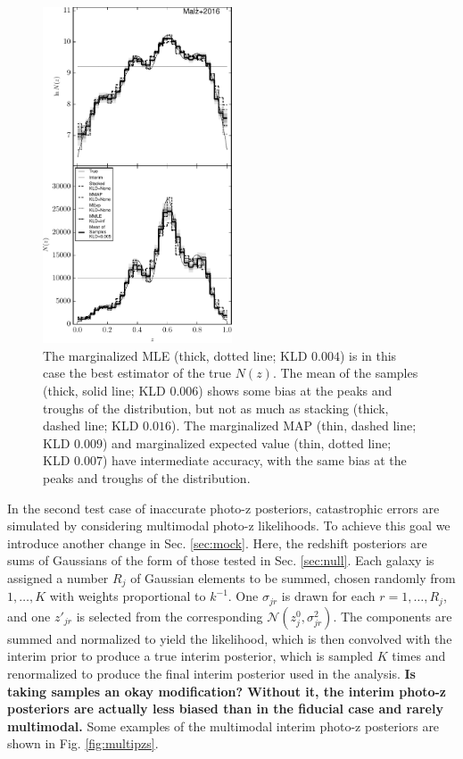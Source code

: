 \documentclass[preprint]{aastex}
\begin{document}
\begin{figure}
\includegraphics[width=0.5\textwidth]{figs/vars/comps.pdf}
\caption{The marginalized MLE (thick, dotted line; KLD $0.004$) is in this case 
the best estimator of the true $N(z)$.  The mean of the samples (thick, solid 
line; KLD $0.006$) shows some bias at the peaks and troughs of the 
distribution, but not as much as stacking (thick, dashed line; KLD $0.016$).  
The marginalized MAP (thin, dashed line; KLD $0.009$) and marginalized expected 
value (thin, dotted line; KLD $0.007$) have intermediate accuracy, with the 
same bias at the peaks and troughs of the distribution.}
\label{fig:noisy-comp}
\end{figure}

In the second test case of inaccurate photo-z posteriors, catastrophic errors 
are simulated by considering multimodal photo-z likelihoods.  To achieve this 
goal we introduce another change in Sec. \ref{sec:mock}.  Here, the redshift 
posteriors are sums of Gaussians of the form of those tested in Sec. 
\ref{sec:null}.  Each galaxy is assigned a number $R_{j}$ of Gaussian elements 
to be summed, chosen randomly from $1,\dots,K$ with weights proportional to 
$k^{-1}$.  One $\sigma_{jr}$ is drawn for each $r=1,\dots,R_{j}$, and one 
$z'_{jr}$ is selected from the corresponding 
$\mathcal{N}(z^{0}_{j},\sigma^{2}_{jr})$.  The components are summed and 
normalized to yield the likelihood, which is then convolved with the interim 
prior to produce a true interim posterior, which is sampled $K$ times and 
renormalized to produce the final interim posterior used in the analysis.  
\textbf{Is taking samples an okay modification?  Without it, the interim 
photo-z posteriors are actually less biased than in the fiducial case and 
rarely multimodal.}  Some examples of the multimodal interim photo-z posteriors 
are shown in Fig. \ref{fig:multipzs}.  
\end{document}
